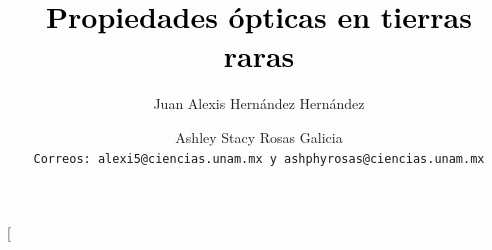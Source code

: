 \documentclass[journal]{IEEEtran}
\begin{document}
\title{\textcolor{black}{Propiedades ópticas en tierras raras}}  

\author{Juan Alexis Hernández Hernández}
\author{Ashley Stacy Rosas Galicia\\
\texttt{Correos: alexi5@ciencias.unam.mx y ashphyrosas@ciencias.unam.mx}}

\twocolumn[
\begin{@twocolumnfalse}
\maketitle
\thispagestyle{firstpage}
\end{@twocolumnfalse}
\end{document}
